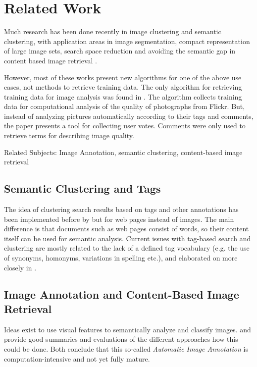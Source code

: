 \section{Related Work}
\label{sec_relatedwork}

Much research has been done recently in image clustering and semantic clustering, with application areas in image segmentation, compact representation of large image sets, search space reduction and avoiding the semantic gap in content based image retrieval \cite{Lim2011}.

\bigskip
However, most of these works present new algorithms for one of the above use cases, not methods to retrieve training data. The only algorithm for retrieving training data for image analysis was found in \cite{Orendovici2010}. The algorithm collects training data for computational analysis of the quality of photographs from Flickr. But, instead of analyzing pictures automatically according to their tags and comments, the paper presents a tool for collecting user votes. Comments were only used to retrieve terms for describing image quality.

\bigskip
Related Subjects: Image Annotation, semantic clustering, content-based image retrieval

\subsection{Semantic Clustering and Tags}
The idea of clustering search results based on tags and other annotations has been implemented before by \cite{Ramage2009} but for web pages instead of images. The main difference is that documents such as web pages consist of words, so their content itself can be used for semantic analysis.
Current issues with tag-based search and clustering are mostly related to the lack of a defined tag vocabulary (e.g. the use of synonyms, homonyms, variations in spelling etc.), and elaborated on more closely in \cite{Auer2011}.

\subsection{Image Annotation and Content-Based Image Retrieval}

Ideas exist to use visual features to semantically analyze and classify images. \cite{Liu2007} and \cite{Zhang2012} provide good summaries and evaluations of the different approaches how this could be done. Both conclude that this so-called \emph{Automatic Image Annotation}  is computation-intensive and not yet fully mature.

